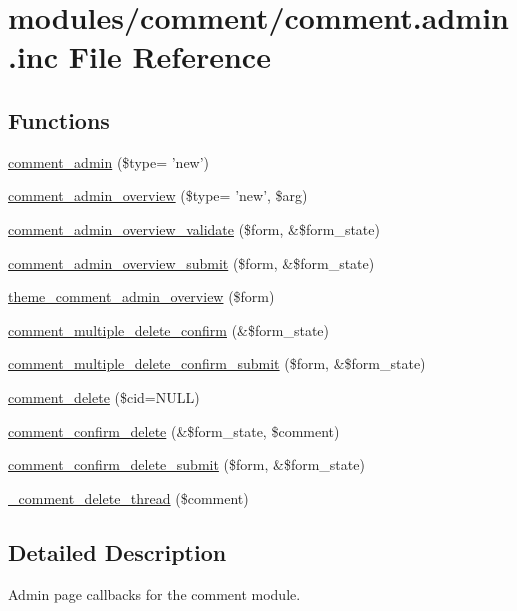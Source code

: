 \hypertarget{comment_8admin_8inc}{
\section{modules/comment/comment.admin.inc File Reference}
\label{comment_8admin_8inc}
}
\subsection*{Functions}
\begin{CompactItemize}
\item 
\hyperlink{comment_8admin_8inc_fe7a967aebd51b588b647caada9b506a}{comment\_\-admin} (\$type= 'new')
\item 
\hyperlink{group__forms_g00b5469fd2c8930040e5e3170a8ac0bd}{comment\_\-admin\_\-overview} (\$type= 'new', \$arg)
\item 
\hyperlink{comment_8admin_8inc_60a994bc18cf6f4a9a71a478700f973e}{comment\_\-admin\_\-overview\_\-validate} (\$form, \&\$form\_\-state)
\item 
\hyperlink{comment_8admin_8inc_e242a86117c7b818ad449f42dd63706c}{comment\_\-admin\_\-overview\_\-submit} (\$form, \&\$form\_\-state)
\item 
\hyperlink{group__themeable_g206b5909bfdb91cc12f8f10edadbf45d}{theme\_\-comment\_\-admin\_\-overview} (\$form)
\item 
\hyperlink{group__forms_gb4ac3160c4ff7fd609772342f0df02a8}{comment\_\-multiple\_\-delete\_\-confirm} (\&\$form\_\-state)
\item 
\hyperlink{comment_8admin_8inc_0995d69b00481eb46c1981112df0999f}{comment\_\-multiple\_\-delete\_\-confirm\_\-submit} (\$form, \&\$form\_\-state)
\item 
\hyperlink{comment_8admin_8inc_4dfff3bfc1b88804411f4faff2b6ddde}{comment\_\-delete} (\$cid=NULL)
\item 
\hyperlink{group__forms_g412ca079e734ea4128aa16477141b82c}{comment\_\-confirm\_\-delete} (\&\$form\_\-state, \$comment)
\item 
\hyperlink{comment_8admin_8inc_4a91e7877e246726a22e875c215845bd}{comment\_\-confirm\_\-delete\_\-submit} (\$form, \&\$form\_\-state)
\item 
\hyperlink{comment_8admin_8inc_01cb7ccc4e6978fadf981c8610b00c12}{\_\-comment\_\-delete\_\-thread} (\$comment)
\end{CompactItemize}


\subsection{Detailed Description}
Admin page callbacks for the comment module. 

